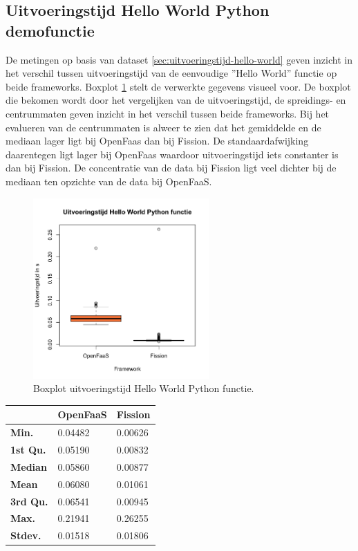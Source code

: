 \subsection{Uitvoeringstijd Hello World Python demofunctie}
De metingen op basis van dataset \ref{sec:uitvoeringstijd-hello-world} geven inzicht in het verschil tussen uitvoeringstijd van de eenvoudige ''Hello World'' functie op beide frameworks. Boxplot \ref{fig:boxplot-hello-functie} stelt de verwerkte gegevens visueel voor.
De boxplot die bekomen wordt door het vergelijken van de uitvoeringstijd, de spreidings- en centrummaten geven inzicht in het verschil tussen beide frameworks. Bij het evalueren van de centrummaten is alweer te zien dat het gemiddelde en de mediaan lager ligt bij OpenFaas dan bij Fission. De standaardafwijking daarentegen ligt lager bij OpenFaas waardoor uitvoeringstijd iets constanter is dan bij Fission. De concentratie van de data bij Fission ligt veel dichter bij de mediaan ten opzichte van de data bij OpenFaaS.
\begin{figure}
    \centering
    \includegraphics[width=0.6\textwidth]{img/boxplot-uitvoeringstijd-hellofunctie.png}
    \caption{Boxplot uitvoeringstijd Hello World Python functie.}
    \label{fig:boxplot-hello-functie}
\end{figure}

\begin{tabular}{@{}lll@{}}
    \toprule
    & \textbf{OpenFaaS} & \textbf{Fission} \\ \midrule
    \textbf{Min.} & 0.04482 & 0.00626 \\
    \textbf{1st Qu.} & 0.05190 & 0.00832 \\
    \textbf{Median} & 0.05860 & 0.00877 \\
    \textbf{Mean} & 0.06080 & 0.01061 \\
    \textbf{3rd Qu.} & 0.06541 & 0.00945 \\
    \textbf{Max.} & 0.21941 & 0.26255 \\
    \textbf{Stdev.} & 0.01518 & 0.01806 \\ \bottomrule
\end{tabular}

